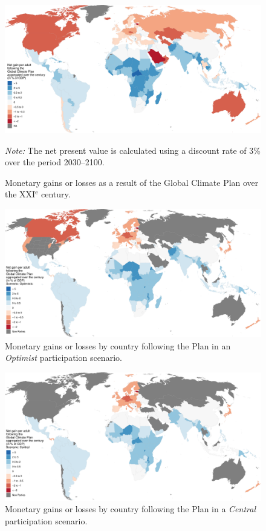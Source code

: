\documentclass[a5paper,english,openany]{memoir}
\begin{document}
\begin{figure}
  \caption[Net gains by country over the XXI$^\text{e}$ century]{Monetary gains or losses as a result of the Global Climate Plan over the XXI$^\text{e}$ century.}\label{fig:gain_npv}
  \centerline{\includegraphics[width=.9\paperheight]{../figures/maps/npv_over_gdp_gcs_adj.pdf}
    } %
  {\footnotesize \textit{Note:} The net present value is calculated using a discount rate of 3\% over the period 2030--2100}.
\end{figure}

\begin{figure}[h!]
  \caption[Net gains in an \textit{Optimist} participation scenario]{Monetary gains or losses by country following the Plan in an \textit{Optimist} participation scenario.}\label{fig:gain_optimist}
  \centerline{\includegraphics[width=.85\paperwidth]{../figures/maps/Soptimistic_npv_over_gdp_gcs_adj.pdf}} 
\end{figure}
\begin{figure}[b!]
  \caption[Net gains in a \textit{Central} participation scenario]{Monetary gains or losses by country following the Plan in a \textit{Central} participation scenario.}\label{fig:gain_central}
  \centerline{\includegraphics[width=.85\paperwidth]{../figures/maps/Scentral_npv_over_gdp_gcs_adj.pdf}
    } 
\end{figure}
\end{document}
